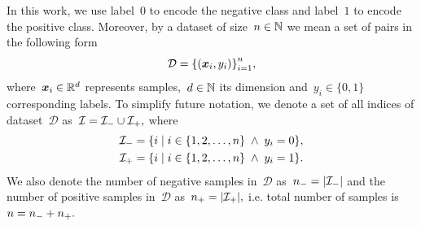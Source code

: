 \begin{notation}[Dataset]\label{not: dataset}
  In this work, we use label~$0$ to encode the negative class and label~$1$ to encode the positive class. Moreover, by a dataset of size~$n \in \mathbb{N}$ we mean a set of pairs in the following form
  \begin{equation*}
    \mathcal{D} = \Brac[c]{(\bm{x}_i, y_i)}_{i=1}^{n},
  \end{equation*}
  where~$\bm{x}_i \in \mathbb{R}^d$ represents samples,~$d \in \mathbb{N}$ its dimension and~$y_i \in \{0, 1\}$ corresponding labels. To simplify future notation, we denote a set of all indices of dataset~$\mathcal{D}$ as~$\mathcal{I} = \mathcal{I}_{-} \cup \mathcal{I}_{+},$ where
  \begin{equation*}
    \begin{aligned}
      \Ineg & = \Set{i}{i \in \{1, 2, \ldots, n\} \; \land \; y_i = 0}, \\
      \Ipos & = \Set{i}{i \in \{1, 2, \ldots, n\} \; \land \; y_i = 1}.
    \end{aligned}
  \end{equation*}
  We also denote the number of negative samples in~$\mathcal{D}$ as~$\nneg = \Brac[v]{\Ineg}$ and the number of positive samples in~$\mathcal{D}$ as~$\npos = \Brac[v]{\Ipos},$ i.e. total number of samples is~$n = n_{-} + n_{+}.$ 
\end{notation}

